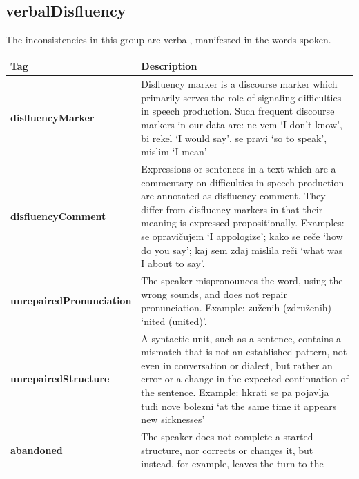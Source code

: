 \documentclass[a4paper,oneside,12pt]{article}
\begin{document}
\subsection{verbalDisfluency}
The inconsistencies in this group are verbal, manifested in the words spoken.
\begin{longtable}{|l|p{12cm}|}
  \hline
  \textbf{Tag}                     & \textbf{Description}                                \\
  \hline
  \endhead
  \textbf{disfluencyMarker}        & Disfluency marker is a discourse marker which
  primarily serves the role of signaling difficulties in speech production. Such
  frequent discourse markers in our data are: ne vem `I don't know', bi rekel `I
  would say', se pravi `so to speak', mislim `I mean'                                    \\
  \hline
  \textbf{disfluencyComment}       & Expressions or sentences in a text which are a
  commentary on difficulties in speech production are annotated as disfluency
  comment. They differ from disfluency markers in that their meaning is
  expressed propositionally. Examples: se opravičujem `I appologize'; kako se
  reče `how do you say'; kaj sem zdaj mislila reči `what was I about to say'.            \\
  \hline
  \textbf{unrepairedPronunciation} & The speaker mispronounces the word, using the wrong
  sounds, and does not repair pronunciation. Example: zuženih (združenih) `nited
  (united)'.                                                                             \\ \hline
  \textbf{unrepairedStructure}     & A syntactic unit, such as a sentence, contains a
  mismatch that is not an established pattern, not even in conversation or
  dialect, but rather an error or a change in the expected continuation of the
  sentence. Example: hkrati se pa pojavlja tudi nove bolezni `at the same time
  it appears new sicknesses'                                                             \\ \hline
  \textbf{abandoned}               & The speaker does not complete a started structure,
  nor corrects or changes it, but instead, for example, leaves the turn to the

\end{longtable}
\end{document}
